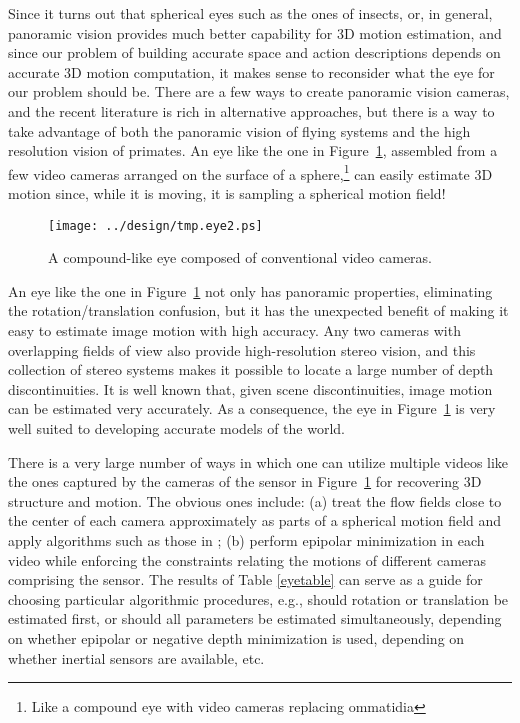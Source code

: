 \documentclass[10pt,twocolumn]{article}
\begin{document}
Since it turns out that spherical eyes such as the ones of insects,
or, in general, panoramic vision provides much better capability for
3D motion estimation, and since our problem of building accurate space
and action descriptions depends on accurate 3D motion computation, it
makes sense to reconsider what the eye for our problem should be.
There are a few ways to create panoramic vision cameras, and the
recent literature is rich in alternative approaches, but there is a
way to take advantage of both the panoramic vision of flying systems
and the high resolution vision of primates. An eye like the one in
Figure~\ref{fig:eye}, assembled from a few video cameras arranged on
the surface of a sphere,\footnote{Like a compound eye with video
cameras replacing ommatidia} can easily estimate 3D motion since,
while it is moving, it is sampling a spherical motion field!

\begin{figure}[htbp]
\centering\texttt{[image: ../design/tmp.eye2.ps]}
  \caption{A compound-like eye composed of conventional video cameras.}
  \label{fig:eye}
\end{figure}

An eye like the one in Figure~\ref{fig:eye} not only has panoramic
properties, eliminating the rotation/translation confusion, but it has
the unexpected benefit of making it easy to estimate image motion with
high accuracy. Any two cameras with overlapping fields of view also
provide high-resolution stereo vision, and this collection of stereo
systems makes it possible to locate a large number of depth
discontinuities. It is well known that, given scene discontinuities,
image motion can be estimated very accurately. As a consequence, the
eye in Figure~\ref{fig:eye} is very well suited to developing accurate
models of the world.

There is a very large number of ways in which one can utilize multiple
videos like the ones captured by the cameras of the sensor in
Figure~\ref{fig:eye} for recovering 3D structure and motion. The
obvious ones include: (a) treat the flow fields close to the center of
each camera approximately as parts of a spherical motion field and
apply algorithms such as those in \cite{proofijcv}; (b) perform
epipolar minimization in each video while enforcing the constraints
relating the motions of different cameras comprising the sensor.  The
results of Table \ref{eyetable} can serve as a guide for choosing
particular algorithmic procedures, e.g., should rotation or
translation be estimated first, or should all parameters be estimated
simultaneously, depending on whether epipolar or negative depth
minimization is used, depending on whether inertial sensors are
available, etc.
\end{document}
